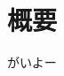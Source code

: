 \documentclass[\homedir/main.tex]{subfiles}
\begin{document}
\chapter*{概要}\label{chap:abstract}
がいよー
\end{document}
